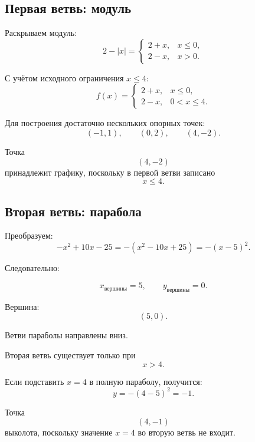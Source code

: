 \documentclass[a4paper,12pt]{article}
\begin{document}
\subsection*{Первая ветвь: модуль}

Раскрываем модуль:
\[
2-|x|
=
\begin{cases}
2+x, & x\le0,\\
2-x, & x>0.
\end{cases}
\]

С учётом исходного ограничения \(x\le4\):
\[
f(x)=
\begin{cases}
2+x, & x\le0,\\
2-x, & 0<x\le4.
\end{cases}
\]

Для построения достаточно нескольких опорных точек:
\[
(-1,1),
\qquad
(0,2),
\qquad
(4,-2).
\]

Точка
\[
(4,-2)
\]
принадлежит графику, поскольку в первой ветви записано
\[
x\le4.
\]

\subsection*{Вторая ветвь: парабола}

Преобразуем:
\[
-x^2+10x-25
=
-(x^2-10x+25)
=
-(x-5)^2.
\]

Следовательно:

\[
x_{\text{вершины}}=5,
\qquad
y_{\text{вершины}}=0.
\]

Вершина:
\[
(5,0).
\]

Ветви параболы направлены вниз.

Вторая ветвь существует только при
\[
x>4.
\]

Если подставить \(x=4\) в полную параболу, получится:
\[
y=-(4-5)^2=-1.
\]

Точка
\[
(4,-1)
\]
выколота, поскольку значение \(x=4\) во вторую ветвь не входит.
\end{document}
